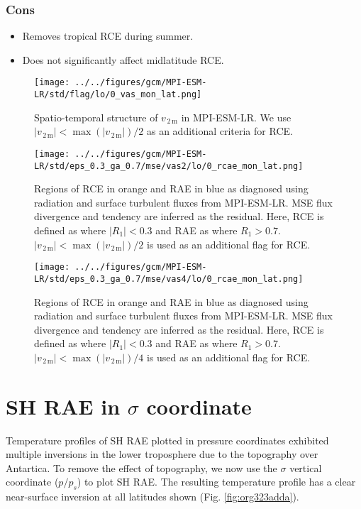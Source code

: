 \documentclass[11pt]{article}
\begin{document}
\subsubsection*{Cons}
\label{sec:org0a06548}
\begin{itemize}
\item Removes tropical RCE during summer.
\item Does not significantly affect midlatitude RCE.
\end{itemize}

\clearpage

\begin{figure}[!h]
\centering
\texttt{[image: ../../figures/gcm/MPI-ESM-LR/std/flag/lo/0\_vas\_mon\_lat.png]}
\caption{\label{fig:org7193867}Spatio-temporal structure of \(v_{\,\mathrm{2\,m}}\) in MPI-ESM-LR. We use \(|v_{\,\mathrm{2\,m}}|<\max(|v_{\,\mathrm{2\,m}}|)/2\) as an additional criteria for RCE.}
\end{figure}

\begin{figure}[!h]
\centering
\texttt{[image: ../../figures/gcm/MPI-ESM-LR/std/eps\_0.3\_ga\_0.7/mse/vas2/lo/0\_rcae\_mon\_lat.png]}
\caption{\label{fig:org075c5db}Regions of RCE in orange and RAE in blue as diagnosed using radiation and surface turbulent fluxes from MPI-ESM-LR. MSE flux divergence and tendency are inferred as the residual. Here, RCE is defined as where \(|R_1| < 0.3\) and RAE as where \(R_1 > 0.7\). \(|v_{\,\mathrm{2\,m}}|<\max(|v_{\,\mathrm{2\,m}}|)/2\) is used as an additional flag for RCE.}
\end{figure}

\begin{figure}[!h]
\centering
\texttt{[image: ../../figures/gcm/MPI-ESM-LR/std/eps\_0.3\_ga\_0.7/mse/vas4/lo/0\_rcae\_mon\_lat.png]}
\caption{\label{fig:org80bb966}Regions of RCE in orange and RAE in blue as diagnosed using radiation and surface turbulent fluxes from MPI-ESM-LR. MSE flux divergence and tendency are inferred as the residual. Here, RCE is defined as where \(|R_1| < 0.3\) and RAE as where \(R_1 > 0.7\). \(|v_{\,\mathrm{2\,m}}|<\max(|v_{\,\mathrm{2\,m}}|)/4\) is used as an additional flag for RCE.}
\end{figure}

\clearpage
\section{SH RAE in \(\sigma\) coordinate}
\label{sec:orgf9e0a67}
Temperature profiles of SH RAE plotted in pressure coordinates exhibited multiple inversions in the lower troposphere due to the topography over Antartica. To remove the effect of topography, we now use the \(\sigma\) vertical coordinate (\(p/p_s\)) to plot SH RAE. The resulting temperature profile has a clear near-surface inversion at all latitudes shown (Fig. \ref{fig:org323adda}).
\end{document}
